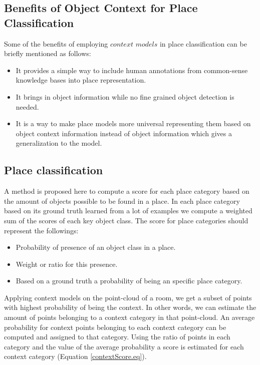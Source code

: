 \subsection{Benefits of Object Context for Place Classification}
\label{BenefitsofObjectContextforPlaceClassification.sec}
Some of the benefits of employing $context$ $models$ in place classification can be briefly mentioned as follows: 
\begin{itemize}
 \item It provides a simple way to include human annotations from common-sense knowledge bases into place 
 representation.
 \item It brings in object information while no fine grained object detection is needed.
 \item It is a way to make place models more universal representing them based on object context information instead
 of object information which gives a generalization to the model.
 
\end{itemize}


\subsection{Place classification}
\label{Place classification.sec}
A method is proposed here to compute a score for each place category based on the amount of objects possible to be
found in a place. 
In each place category based on its ground truth learned from a lot of examples we compute a weighted sum of the 
scores of each key object class.
The score for place categories should represent the followings:

\begin{itemize}
 \item Probability of presence of an object class in a place.
 \item Weight or ratio for this presence.
 \item Based on a ground truth a probability of being an specific place category.
\end{itemize}

Applying context models on the point-cloud of a room, we get a subset of points with highest probability of being 
the context. 
In other words, we can estimate the amount of points belonging to a context category in that point-cloud.
An average probability for context points belonging to each context category can be computed and assigned to that category.
Using the ratio of points in each category and the value of the average probability a score is estimated for each context
category (Equation \ref{contextScore.eq}).

